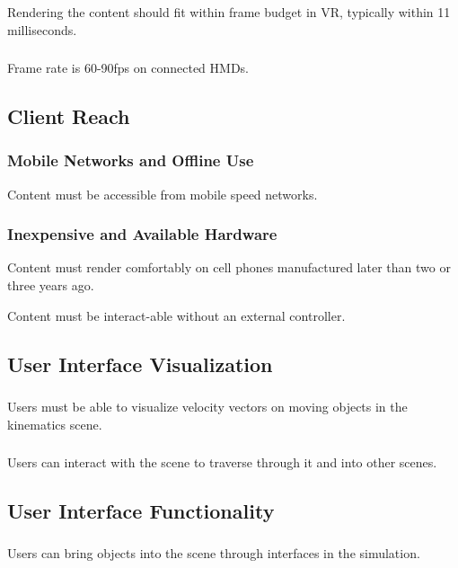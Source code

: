 \documentclass[onecolumn, draftclsnofoot,10pt, compsoc]{IEEEtran}
\begin{document}
\subsubsection{}
Rendering the content should fit within frame budget in VR, typically within 11 milliseconds.
\subsubsection{}
Frame rate is 60-90fps on connected HMDs.

\subsection{Client Reach}
\subsubsection{Mobile Networks and Offline Use}
Content must be accessible from mobile speed networks.
\subsubsection{Inexpensive and Available Hardware}
Content must render comfortably on cell phones manufactured later than two or three years ago.

Content must be interact-able without an external controller.

\subsection{User Interface Visualization}
\subsubsection{}
Users must be able to visualize velocity vectors on moving objects in the kinematics scene.
\subsubsection{}
Users can interact with the scene to traverse through it and into other scenes.
\subsection{User Interface Functionality}
\subsubsection{}
Users can bring objects into the scene through interfaces in the simulation.
\end{document}
